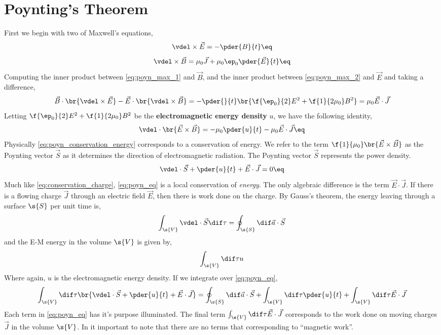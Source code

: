 \documentclass{article}
\begin{document}
\section{Poynting's Theorem}
First we begin with two of Maxwell's equations,
\[ \vdel \times \vec{E} = - \pder{B}{t} \eq \label{eq:poyn_max_1}\]
\[ \vdel \times \vec{B} = \mu_0 \vec{J} + \mu_0 \ep_0 \pder{\vec{E}}{t} \eq \label{eq:poyn_max_2}\]
Computing the inner product between \cref{eq:poyn_max_1} and $\vec{B}$, and the inner product between \cref{eq:poyn_max_2} and $\vec{E}$ and taking a difference,
\[ \vec{B} \cdot \br{\vdel \times \vec{E}} - \vec{E} \cdot \br{\vdel \times \vec{B}} = - \pder{}{t}\br{\f{\ep_0}{2} E^2 + \f{1}{2 \mu_0} B^2} = \mu_0 \vec{E} \cdot \vec{J}\]
Letting $\f{\ep_0}{2} E^2 + \f{1}{2 \mu_0} B^2$ be the \textbf{electromagnetic energy density} $u$, we have the following identity,
\[ \vdel\cdot\br{\vec{E} \times \vec{B}} = - \mu_0 \pder{u}{t} - \mu_0 \vec{E} \cdot \vec{J} \eq \label{eq:poyn_conservation_energy} \]
Physically \cref{eq:poyn_conservation_energy} corresponds to a conservation of energy. We refer to the term $\f{1}{\mu_0} \br{\vec{E} \times \vec{B}}$ as the Poynting vector $\vec{S}$ as it determines the direction of electromagnetic radiation. The Poynting vector $\vec{S}$ represents the power density.
\[ \vdel \cdot \vec{S} + \pder{u}{t} + \vec{E} \cdot \vec{J} = 0 \eq \label{eq:poyn_eq}\]
Much like \cref{eq:conservation_charge}, \cref{eq:poyn_eq} is a local conservation of \textit{energy}. The only algebraic difference is the term $\vec{E} \cdot \vec{J}$. If there is a flowing charge $\vec{J}$ through an electric field $\vec{E}$, then there is work done on the charge. By Gauss's theorem, the energy leaving through a surface $\s{S}$ per unit time is,
\[ \int_{\s{V}} \vdel \cdot \vec{S} \dif \tau =  \oint_{\s{S}} \dif \vec{a}\cdot \vec{S} \]
and the E-M energy in the volume $\s{V}$ is given by,
\[ \int_{\s{V}} \dif \tau u \]
Where again, $u$ is the electromagnetic energy density. If we integrate over \cref{eq:poyn_eq},
\[\int_{\s{V}} \dif \tau \br{\vdel \cdot \vec{S} +\pder{u}{t} + \vec{E} \cdot \vec{J}} = \oint_{\s{S}} \dif \vec{a}\cdot \vec{S} + \int_{\s{V}} \dif \tau \pder{u}{t} + \int_{\s{V}} \dif \tau \vec{E} \cdot \vec{J} \]
Each term in \cref{eq:poyn_eq} has it's purpose illuminated. The final term $\int_{\s{V}} \dif \tau \vec{E} \cdot \vec{J}$ corresponds to the work done on moving charges $\vec{J}$ in the volume $\s{V}$. In it important to note that there are no terms that corresponding to ``magnetic work''. \\
\end{document}
